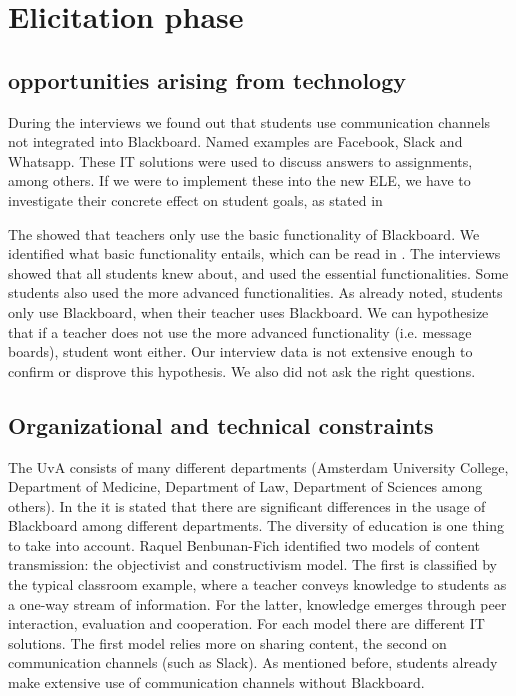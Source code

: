 \chapter{Elicitation phase}

\section{opportunities arising from technology}
	During the interviews we found out that students use communication channels not integrated into Blackboard. Named examples are Facebook, Slack and Whatsapp. These IT solutions were used to discuss answers to assignments, among others. If we were to implement these into the new ELE, we have to investigate their concrete effect on student goals, as stated in 

	The \rreport showed that teachers only use the basic functionality of Blackboard. We identified what basic functionality entails, which can be read in . The interviews showed that all students knew about, and used the essential functionalities. Some students also used the more advanced functionalities. As already noted, students only use Blackboard, when their teacher uses Blackboard. We can hypothesize that if a teacher does not use the more advanced functionality (i.e. message boards), student wont either. Our interview data is not extensive enough to confirm or disprove this hypothesis. We also did not ask the right questions. 
	
	\section{Organizational and technical constraints}
	The UvA consists of many different departments (Amsterdam University College, Department of Medicine, Department of Law, Department of Sciences among others). In the \rreport it is stated that there are significant differences in the usage of Blackboard among different departments. The diversity of education is one thing to take into account. Raquel Benbunan-Fich \cite{improveEducationWithIt} identified two models of content transmission: the objectivist and constructivism model. The first is classified by the typical classroom example, where a teacher conveys knowledge to students as a one-way stream of information. For the latter, knowledge emerges through peer interaction, evaluation and cooperation. For each model there are different IT solutions. The first model relies more on sharing content, the second on communication channels (such as Slack). As mentioned before, students already make extensive use of communication channels without Blackboard. \\
	
